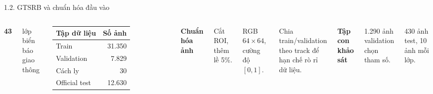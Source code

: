\documentclass[aspectratio=169,10pt]{beamer}
\newcommand{\insertpaperreference}{}
\newcommand{\paperreference}[1]{\gdef\insertpaperreference{#1}}
\newcommand{\smalltable}{\fontsize{9}{11}\selectfont\renewcommand{\arraystretch}{1.25}}
\begin{document}
\paperreference{\href{https://doi.org/10.1109/IJCNN.2011.6033395}{Stallkamp et al., IJCNN 2011}}
\begin{frame}{1.2. GTSRB và chuẩn hóa đầu vào}\relax
\begin{columns}[T,onlytextwidth]
{\fontsize{30}{33}\selectfont\bfseries 43}\par
lớp biển báo giao thông\par\vspace{3mm}
\smalltable
\begin{tabular}{lr}
\rowcolor{Blue} \color{white}\bfseries Tập dữ liệu & \color{white}\bfseries Số ảnh\\\midrule
Train & 31.350\\
Validation & 7.829\\
Cách ly & 30\\
Official test & 12.630\\\bottomrule
\end{tabular}
\textbf{Chuẩn hóa ảnh}\par
Cắt ROI, thêm lề 5\%.\par
RGB $64\times64$, cường độ $[0,1]$.\par
Chia train/validation theo track để hạn chế rò rỉ dữ liệu.\par\vspace{3mm}
\textbf{Tập con khảo sát}\par
1.290 ảnh validation chọn tham số.\par
430 ảnh test, 10 ảnh mỗi lớp.
\end{columns}
\end{frame}
\end{document}
